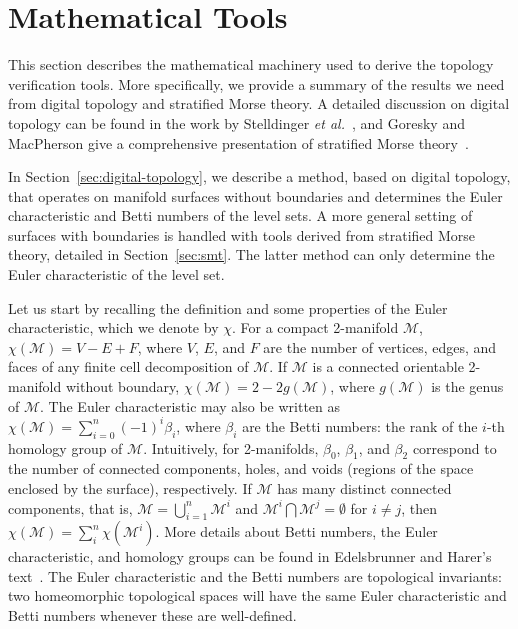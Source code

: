 \section{Mathematical Tools}
\label{sec:math-foundations}

This section describes the mathematical machinery used to derive the
topology verification tools. More specifically, we provide a summary
of the results we need from digital topology and stratified Morse
theory.  A detailed discussion on digital topology can be found in
the work by Stelldinger \emph{et al.}~\cite{siqueira:2007}, and Goresky and
MacPherson give a comprehensive presentation of stratified Morse
theory~\cite{Goresky:1988:SMT}.

In Section~\ref{sec:digital-topology}, we describe a method, based on
digital topology, that operates on manifold surfaces without
boundaries and determines the Euler characteristic and Betti numbers
of the level sets. A more general setting of surfaces with boundaries
is handled with tools derived from stratified Morse theory, detailed
in Section~\ref{sec:smt}.  The latter method can only determine the
Euler characteristic of the level set.

Let us start by recalling the definition and some properties of the
Euler characteristic, which we denote by $\chi$. For a compact
2-manifold $\mathcal{M}$, $\chi(\mathcal{M}) = V - E + F$, where $V$,
$E$, and $F$ are the number of vertices, edges, and faces of any finite
cell decomposition of $\mathcal{M}$. If $\mathcal{M}$ is a connected
orientable 2-manifold without boundary, $\chi(\mathcal{M}) = 2 -
2g(\mathcal{M})$, where $g(\mathcal{M})$ is the genus of
$\mathcal{M}$. The Euler characteristic may also be written as
$\chi(\mathcal{M}) = \sum_{i=0}^n(-1)^i \beta_i$, where $\beta_i$ are
the Betti numbers: the rank of the $i$-th homology group of
$\mathcal{M}$.
Intuitively, for 2-manifolds, $\beta_0$, $\beta_1$, and $\beta_2$
correspond to the number of connected components, holes, and voids
(regions of the space enclosed by the surface), respectively.  If
$\mathcal{M}$ has many distinct connected components, that is,
$\mathcal{M} = \bigcup^n_{i = 1} \mathcal{M}^i$ and $\mathcal{M}^i
\bigcap \mathcal{M}^j = \emptyset$ for $i \neq j$, then
$\chi(\mathcal{M}) = \sum_{i}^n \chi(\mathcal{M}^i)$. More details
about Betti numbers, the Euler characteristic, and homology groups can
be found in Edelsbrunner and Harer's text~\cite{edelsbrunner10}. The
Euler characteristic and the Betti numbers are topological invariants:
two homeomorphic topological spaces will have the same Euler
characteristic and Betti numbers whenever these are well-defined.


